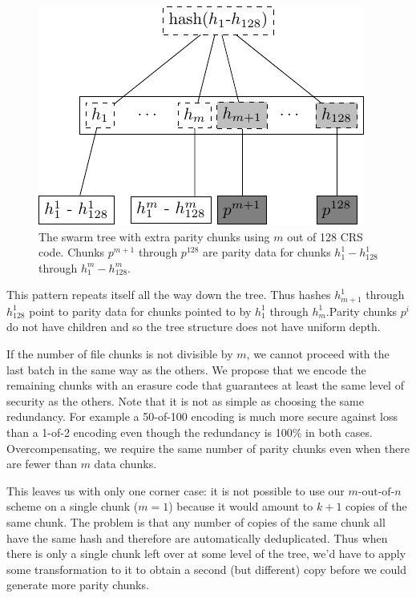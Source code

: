 \begin{figure}[htbp]
   \centering
   \includegraphics{fig/tree-with-erasure.pdf} %
   \caption{The swarm tree with extra parity chunks using $m$ out of 128 CRS code. Chunks $p^{m+1}$ through $p^{128}$ are parity data for chunks $h^1_1 - h^1_{128}$ through $h^{m}_1  - h^{m}_{128}$.}
   \label{fig:tree-with-erasure}
\end{figure}


This pattern repeats itself all the way down the tree. Thus hashes $h^1_{m+1}$ through $h^1_{128}$ point to parity data for chunks pointed to by $h^1_1$ through $h^1_{m}$.Parity chunks $p^i$ do not have children and so the tree structure does not have uniform depth.

If the number of file chunks is not divisible by $m$, we cannot proceed with the last batch in the same way as the others. We propose that we encode the remaining chunks with an erasure code that guarantees at least the same level of security as the others. Note that it is not as simple as choosing the same redundancy. For example a 50-of-100 encoding is much more secure against loss than a 1-of-2 encoding even though the redundancy is 100\% in both cases. Overcompensating, we require the same number of parity chunks even when there are fewer than $m$ data chunks.

This leaves us with only one corner case: it is not possible to use our $m\text{-out-of-}n$ scheme on a single chunk ($m=1$) because it would amount to $k+1$ copies of the same chunk. The problem is that any number of copies of the same chunk all have the same hash and therefore are automatically deduplicated. Thus when there is only a single chunk left over at some level of the tree, we'd have to apply some transformation to it to obtain a second (but different) copy before we could generate more parity chunks.


